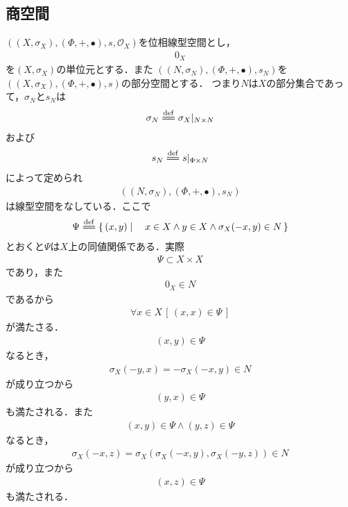 \subsection{商空間}
	$\left((X,\sigma_X),(\Phi,+,\bullet),s,\mathscr{O}_X\right)$を位相線型空間とし，
	\begin{align}
		0_X
	\end{align}
	を$(X,\sigma_X)$の単位元とする．また
	$\left((N,\sigma_N),(\Phi,+,\bullet),s_N\right)$を$\left((X,\sigma_X),(\Phi,+,\bullet),s\right)$の部分空間とする．
	つまり$N$は$X$の部分集合であって，$\sigma_N$と$s_N$は
	\begin{align}
		\sigma_N \defeq \sigma_X|_{N \times N}
	\end{align}
	および
	\begin{align}
		s_N \defeq s|_{\Phi \times N}
	\end{align}
	によって定められ
	\begin{align}
		\left((N,\sigma_N),(\Phi,+,\bullet),s_N\right)
	\end{align}
	は線型空間をなしている．ここで
	\begin{align}
		\Psi \defeq \Set{(x,y)}{x \in X \wedge y \in X \wedge \sigma_X(-x,y) \in N}
	\end{align}
	とおくと$\Psi$は$X$上の同値関係である．実際
	\begin{align}
		\Psi \subset X \times X
	\end{align}
	であり，また
	\begin{align}
		0_X \in N
	\end{align}
	であるから
	\begin{align}
		\forall x \in X\, \left[\, (x,x) \in \Psi\, \right]
	\end{align}
	が満たさる．
	\begin{align}
		(x,y) \in \Psi
	\end{align}
	なるとき，
	\begin{align}
		\sigma_X(-y,x) = -\sigma_X(-x,y) \in N
	\end{align}
	が成り立つから
	\begin{align}
		(y,x) \in \Psi
	\end{align}
	も満たされる．また
	\begin{align}
		(x,y) \in \Psi \wedge (y,z) \in \Psi
	\end{align}
	なるとき，
	\begin{align}
		\sigma_X(-x,z) = \sigma_X\left(\sigma_X(-x,y),\sigma_X(-y,z)\right) \in N
	\end{align}
	が成り立つから
	\begin{align}
		(x,z) \in \Psi
	\end{align}
	も満たされる．
	
